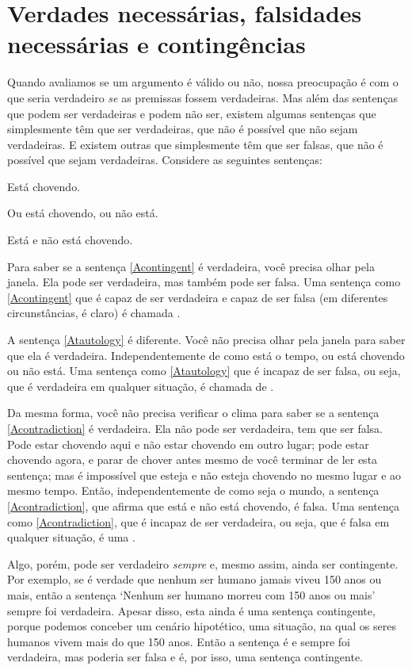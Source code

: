 \section[Verdades e falsidades necessárias e contingência]{Verdades necessárias, falsidades necessárias e contingências}

Quando avaliamos se um argumento é válido ou não, nossa preocupação é com o que seria verdadeiro \emph{se} as premissas fossem verdadeiras.
Mas além das sentenças que podem ser verdadeiras e podem não ser, existem algumas sentenças que simplesmente têm que ser verdadeiras, que não é possível que não sejam verdadeiras.
E existem outras que simplesmente têm que ser falsas, que não é possível que sejam verdadeiras.
Considere as seguintes sentenças:
	\begin{earg}
		\item[\ex{Acontingent}] Está chovendo.
		\item[\ex{Atautology}] Ou está chovendo, ou não está.
		\item[\ex{Acontradiction}] Está e não está chovendo.
	\end{earg}
Para saber se a sentença \ref{Acontingent} é verdadeira, você precisa olhar pela janela. Ela pode ser verdadeira, mas também pode ser falsa.
Uma sentença como \ref{Acontingent} que é capaz de ser verdadeira e capaz de ser falsa (em diferentes circunstâncias, é claro) é chamada .

A sentença \ref{Atautology} é diferente.
Você não precisa olhar pela janela para saber que ela é verdadeira. Independentemente de como está o tempo, ou está chovendo ou não está.
Uma sentença como \ref{Atautology} que é incapaz de ser falsa, ou seja, que é verdadeira em qualquer situação, é chamada de .

Da mesma forma, você não precisa verificar o clima para saber se a sentença \ref{Acontradiction} é verdadeira.
Ela não pode ser verdadeira, tem que ser falsa.
Pode estar chovendo aqui e não estar chovendo em outro lugar; pode estar chovendo agora, e parar de chover antes mesmo de você terminar de ler esta sentença; mas é impossível que esteja e não esteja chovendo no mesmo lugar e ao mesmo tempo.
Então, independentemente de como seja o mundo, a sentença \ref{Acontradiction}, que afirma que está e não está chovendo, é falsa.
Uma sentença como \ref{Acontradiction}, que é incapaz de ser verdadeira, ou seja, que é falsa em qualquer situação, é uma .

Algo, porém, pode ser verdadeiro \emph{sempre} e, mesmo assim, ainda ser contingente. Por exemplo, se é verdade que nenhum ser humano jamais viveu 150 anos ou mais, então a sentença `Nenhum ser humano morreu com 150 anos ou mais' sempre foi verdadeira.
Apesar disso, esta ainda é uma sentença contingente, porque podemos conceber um cenário hipotético, uma situação, na qual os seres humanos vivem mais do que 150 anos.
Então a sentença é e sempre foi verdadeira, mas poderia ser falsa e é, por isso, uma sentença contingente.

